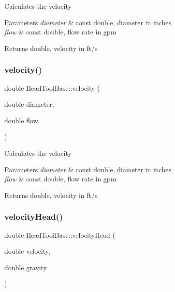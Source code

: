Calculates the velocity


\begin{DoxyParams}{Parameters}
{\em diameter} & const double, diameter in inches \\
\hline
{\em flow} & const double, flow rate in gpm\\
\hline
\end{DoxyParams}
\begin{DoxyReturn}{Returns}
double, velocity in ft/s 
\end{DoxyReturn}
\mbox{\label{class_head_tool_base_a0412306c4adda62e5840342b0d26ac06}} 
\subsubsection{\texorpdfstring{velocity()}{velocity()}\hspace{0.1cm}{\footnotesize\ttfamily [3/3]}}
{\footnotesize\ttfamily double Head\+Tool\+Base\+::velocity (\begin{DoxyParamCaption}\item[{double}]{diameter,  }\item[{double}]{flow }\end{DoxyParamCaption})\hspace{0.3cm}{\ttfamily [protected]}}

Calculates the velocity


\begin{DoxyParams}{Parameters}
{\em diameter} & const double, diameter in inches \\
\hline
{\em flow} & const double, flow rate in gpm\\
\hline
\end{DoxyParams}
\begin{DoxyReturn}{Returns}
double, velocity in ft/s 
\end{DoxyReturn}
\mbox{\label{class_head_tool_base_a461c3d53a92763ca08c9a5bbcbef83c3}} 
\subsubsection{\texorpdfstring{velocity\+Head()}{velocityHead()}\hspace{0.1cm}{\footnotesize\ttfamily [1/3]}}
{\footnotesize\ttfamily double Head\+Tool\+Base\+::velocity\+Head (\begin{DoxyParamCaption}\item[{double}]{velocity,  }\item[{double}]{gravity }\end{DoxyParamCaption})\hspace{0.3cm}{\ttfamily [protected]}}

